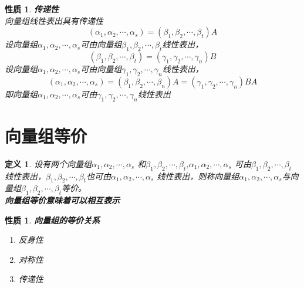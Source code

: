 \documentclass[12pt,oneside]{ctexbook}
\newtheorem{definition}[subsection]{定义}
\newtheorem{property}[subsection]{性质}
\begin{document}
\begin{property}
    \textbf{传递性}\\
    向量组线性表出具有传递性
    \[\left( \alpha_{1},\alpha_{2},\cdots,\alpha_{s} \right) = \left( \beta_{1},\beta_{2},\cdots,\beta_{t} \right)A\]
    设向量组\(\alpha_{1},\alpha_{2},\cdots,\alpha_{s}\)可由向量组\(\beta_{1},\beta_{2},\cdots,\beta_{t}\)线性表出，
    \[\left( \beta_{1},\beta_{2},\cdots,\beta_{t} \right) = \left( \gamma_{1},\gamma_{2},\cdots,\gamma_{n} \right)B\]
    设向量组\(\alpha_{1},\alpha_{2},\cdots,\alpha_{s}\)可由向量组\(\gamma_{1},\gamma_{2},\cdots,\gamma_{n}\)线性表出，
    \[\left( \alpha_{1},\alpha_{2},\cdots,\alpha_{s} \right) = \left( \beta_{1},\beta_{2},\cdots,\beta_{n} \right)A = \left( \gamma_{1},\gamma_{2},\cdots,\gamma_{n} \right)BA\]
    即向量组\(\alpha_{1},\alpha_{2},\cdots,\alpha_{s}\)可由\(\gamma_{1},\gamma_{2},\cdots,\gamma_{n}\)线性表出
\end{property}
\section{向量组等价}
\begin{definition}
    设有两个向量组\(\alpha_{1},\alpha_{2},\cdots,\alpha_{s}\) 和\(\beta_{1},\beta_{2},\cdots,\beta_{t}\),\(\alpha_{1},\alpha_{2},\cdots,\alpha_{s}\) 可由\(\beta_{1},\beta_{2},\cdots,\beta_{t}\) 线性表出，\(\beta_{1},\beta_{2},\cdots,\beta_{t}\)也可由\(\alpha_{1},\alpha_{2},\cdots,\alpha_{s}\) 线性表出，则称向量组\(\alpha_{1},\alpha_{2},\cdots,\alpha_{s}\)与向量组\(\beta_{1},\beta_{2},\cdots,\beta_{t}\)等价。
    \\ \textbf{向量组等价意味着可以相互表示}
\end{definition}

\begin{property}
    \textbf{向量组的等价关系}
    \begin{enumerate}
        \item 反身性
        \item 对称性
        \item 传递性
    \end{enumerate}
\end{property}
\end{document}
